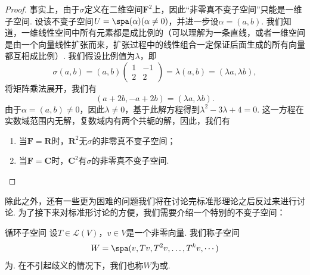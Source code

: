 \begin{proof}
    事实上，由于$\sigma$定义在二维空间$\mathbf{F}^2$上，因此``非零真不变子空间''只能是一维子空间. 设该不变子空间$U=\spa(\alpha)(\alpha\neq 0)$，并进一步设$\alpha=(a,b)$. 我们知道，一维线性空间中所有元素都是成比例的（可以理解为一条直线，或者一维空间是由一个向量线性扩张而来，扩张过程中的线性组合一定保证后面生成的所有向量都互相成比例）. 我们假设比例值为$\lambda$，即
    \[\sigma(a,b)=(a,b)\begin{pmatrix}
            1 & -1 \\ 2 & 2
        \end{pmatrix}=\lambda(a,b)=(\lambda a,\lambda b),\]
    将矩阵乘法展开，我们有
    \[(a+2b,-a+2b)=(\lambda a,\lambda b).\]
    由于$\alpha=(a,b)\neq 0$，因此$\lambda\neq 0$，基于此解方程得到$\lambda^2-3\lambda+4=0$. 这一方程在实数域范围内无解，复数域内有两个共轭的解，因此，我们有
    \begin{enumerate}
        \item 当$\mathbf{F}=\mathbf{R}$时，$\mathbf{R}^2$无$\sigma$的非零真不变子空间；

        \item 当$\mathbf{F}=\mathbf{C}$时，$\mathbf{C}^2$有$\sigma$的非零真不变子空间.
    \end{enumerate}
\end{proof}

除此之外，还有一些更为困难的问题我们将在讨论完标准形理论之后反过来进行讨论. 为了接下来对标准形讨论的方便，我们需要介绍一个特别的不变子空间：
\begin{definition}{}{循环子空间}
    设$T\in\mathcal{L}(V)$，$v\in V$是一个非零向量. 我们称子空间
    \[W=\spa(v,Tv,T^2v,\ldots,T^kv,\cdots)\]
    为. 在不引起歧义的情况下，我们也称$W$为或.
\end{definition}

